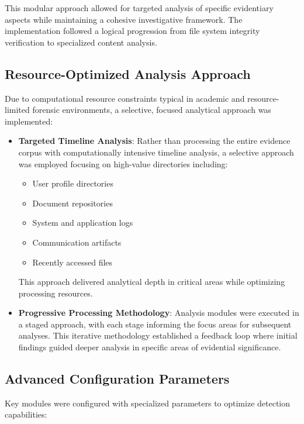This modular approach allowed for targeted analysis of specific evidentiary aspects while maintaining a cohesive investigative framework. The implementation followed a logical progression from file system integrity verification to specialized content analysis.

\subsection{Resource-Optimized Analysis Approach}
Due to computational resource constraints typical in academic and resource-limited forensic environments, a selective, focused analytical approach was implemented:

\begin{itemize}
    \item \textbf{Targeted Timeline Analysis}: Rather than processing the entire evidence corpus with computationally intensive timeline analysis, a selective approach was employed focusing on high-value directories including:
    \begin{itemize}
        \item User profile directories
        \item Document repositories
        \item System and application logs
        \item Communication artifacts
        \item Recently accessed files
    \end{itemize}
    This approach delivered analytical depth in critical areas while optimizing processing resources.
    
    \item \textbf{Progressive Processing Methodology}: Analysis modules were executed in a staged approach, with each stage informing the focus areas for subsequent analyses. This iterative methodology established a feedback loop where initial findings guided deeper analysis in specific areas of evidential significance.
\end{itemize}


\subsection{Advanced Configuration Parameters}
Key modules were configured with specialized parameters to optimize detection capabilities:

